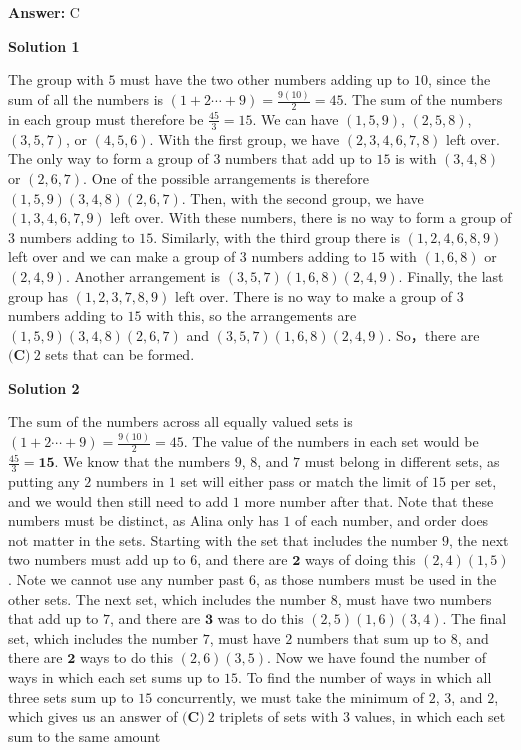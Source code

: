 \begin{enumerate}
 \textbf{Answer: }C



\textbf{Solution 1}

The group with $5$ must have the two other numbers adding up to $10$, since the sum of all the numbers is $(1 + 2 \cdots + 9) = \frac{9(10)}{2} = 45$. The sum of the numbers in each group must therefore be $\frac{45}{3}=15$. We can have $(1, 5, 9)$, $(2, 5, 8)$, $(3, 5, 7)$, or $(4, 5, 6)$. With the first group, we have $(2, 3, 4, 6, 7, 8)$ left over. The only way to form a group of $3$ numbers that add up to $15$ is with $(3, 4, 8)$ or $(2, 6, 7)$. One of the possible arrangements is therefore $(1, 5, 9) (3, 4, 8) (2, 6, 7)$. Then, with the second group, we have $(1, 3, 4, 6, 7, 9)$ left over. With these numbers, there is no way to form a group of $3$ numbers adding to $15$. Similarly, with the third group there is $(1, 2, 4, 6, 8, 9)$ left over and we can make a group of $3$ numbers adding to $15$ with $(1, 6, 8)$ or $(2, 4, 9)$. Another arrangement is $(3, 5, 7) (1, 6, 8) (2, 4, 9)$. Finally, the last group has $(1, 2, 3, 7, 8, 9)$ left over. There is no way to make a group of $3$ numbers adding to $15$ with this, so the arrangements are $(1, 5, 9) (3, 4, 8) (2, 6, 7)$ and $(3, 5, 7) (1, 6, 8) (2, 4, 9)$. So，there are $\boxed{\textbf{(C)}\ 2}$ sets that can be formed.

 



\textbf{Solution 2}

The sum of the numbers across all equally valued sets is $(1 + 2 \cdots + 9) = \frac{9(10)}{2} = 45$. The value of the numbers in each set would be $\frac{45}{3} = \textbf{15}$. We know that the numbers $9$, $8$, and $7$ must belong in different sets, as putting any $2$ numbers in $1$ set will either pass or match the limit of $15$ per set, and we would then still need to add $1$ more number after that. Note that these numbers must be distinct, as Alina only has $1$ of each number, and order does not matter in the sets. Starting with the set that includes the number $9$, the next two numbers must add up to $6$, and there are $\textbf{2}$ ways of doing this $(2,4) (1,5)$. Note we cannot use any number past $6$, as those numbers must be used in the other sets. The next set, which includes the number $8$, must have two numbers that add up to $7$, and there are $\textbf{3}$ was to do this $(2,5) (1,6) (3,4)$. The final set, which includes the number $7$, must have $2$ numbers that sum up to $8$, and there are $\textbf{2}$ ways to do this $(2,6) (3,5)$. Now we have found the number of ways in which each set sums up to $15$. To find the number of ways in which all three sets sum up to $15$ concurrently, we must take the minimum of $2$, $3$, and $2$, which gives us an answer of $\boxed{\textbf{(C)}\ 2}$ triplets of sets with 3 values, in which each set sum to the same amount


\end{enumerate}
